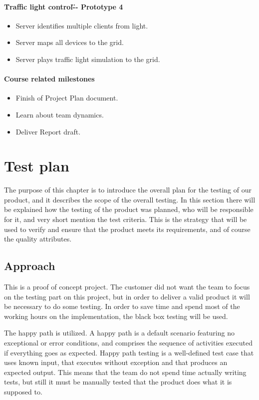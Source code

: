 \paragraph{\"Traffic light control\" -- Prototype 4}
\begin{itemize}
	\item Server identifies multiple clients from light.
	\item Server maps all devices to the grid.
	\item Server plays traffic light simulation to the grid.
\end{itemize}

\paragraph{Course related milestones}
\begin{itemize}
	\item Finish of Project Plan document.
	\item Learn about team dynamics.
	\item Deliver Report draft.
\end{itemize}

\section{Test plan}
The purpose of this chapter is to introduce the overall plan for the testing of our product, and it describes the scope of the overall testing.
In this section there will be explained how the testing of the product was planned, who will be responsible for it, and very short mention the test criteria.
This is the strategy that will be used to verify and ensure that the product meets its requirements, and of course the quality attributes. 

\subsection{Approach}

This is a proof of concept project. The customer did not want the team to focus on the testing part on this project, but in order to deliver a valid product it will be necessary to do some testing. In order to save time and spend most of the working hours on the implementation, the black box testing will be used.  

The happy path is utilized. A happy path is a default scenario featuring no exceptional or error conditions, and comprises the sequence of activities executed if everything goes as expected. Happy path testing is a well-defined test case that uses known input, that executes without exception and that produces an expected output. This means that the team do not spend time actually writing tests, but still it must be manually tested that the product does what it is supposed to.

